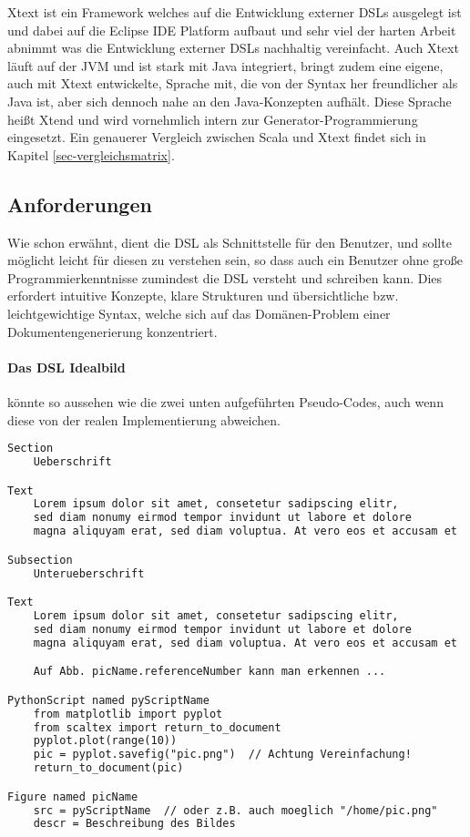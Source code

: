 Xtext ist ein Framework welches auf die Entwicklung externer DSLs
ausgelegt ist und dabei auf die Eclipse IDE Platform aufbaut
und sehr viel der harten Arbeit abnimmt was die Entwicklung
externer DSLs nachhaltig vereinfacht.
Auch Xtext läuft auf der JVM und ist stark mit Java integriert, bringt
zudem eine eigene, auch mit Xtext entwickelte, Sprache mit, die von der
Syntax her freundlicher als Java ist, aber sich dennoch nahe an den
Java-Konzepten aufhält. Diese Sprache heißt Xtend und wird vornehmlich
intern zur Generator-Programmierung eingesetzt. Ein genauerer Vergleich
zwischen Scala und Xtext findet sich in Kapitel \ref{sec-vergleichsmatrix}.

\subsection{Anforderungen}

Wie schon erwähnt, dient die DSL als Schnittstelle für den Benutzer,
und sollte möglicht leicht für diesen zu verstehen sein, so dass
auch ein Benutzer ohne große Programmierkenntnisse zumindest die
DSL versteht und schreiben kann. Dies erfordert intuitive Konzepte,
klare Strukturen und übersichtliche bzw. leichtgewichtige Syntax, welche
sich auf das Domänen-Problem einer Dokumentengenerierung konzentriert.

\paragraph{Das DSL Idealbild} könnte so aussehen wie die zwei unten
aufgeführten Pseudo-Codes, auch wenn diese von der
realen Implementierung abweichen. %

\begin{lstlisting}[language=TeX]
Section
    Ueberschrift

Text
    Lorem ipsum dolor sit amet, consetetur sadipscing elitr,
    sed diam nonumy eirmod tempor invidunt ut labore et dolore
    magna aliquyam erat, sed diam voluptua. At vero eos et accusam et

Subsection
    Unterueberschrift

Text
    Lorem ipsum dolor sit amet, consetetur sadipscing elitr,
    sed diam nonumy eirmod tempor invidunt ut labore et dolore
    magna aliquyam erat, sed diam voluptua. At vero eos et accusam et

    Auf Abb. picName.referenceNumber kann man erkennen ...

PythonScript named pyScriptName
    from matplotlib import pyplot
    from scaltex import return_to_document
    pyplot.plot(range(10))
    pic = pyplot.savefig("pic.png")  // Achtung Vereinfachung!
    return_to_document(pic)

Figure named picName
    src = pyScriptName  // oder z.B. auch moeglich "/home/pic.png"
    descr = Beschreibung des Bildes
\end{lstlisting}


